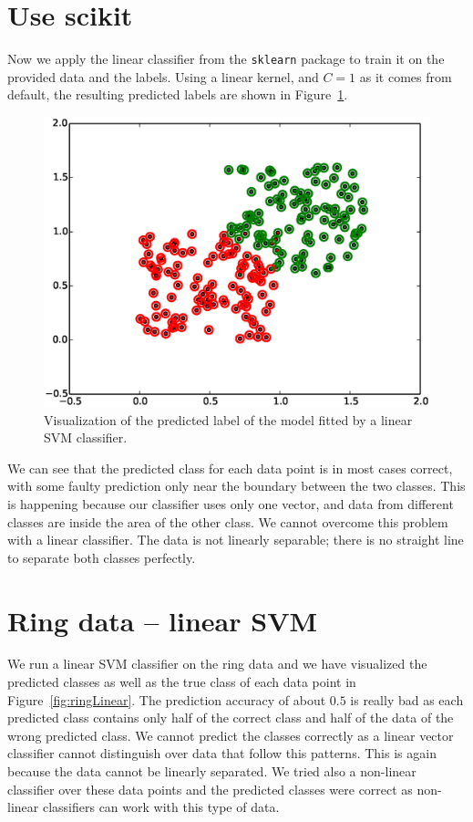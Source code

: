 \documentclass[a4paper,10pt]{article}
\begin{document}
\section{Use scikit}
Now we apply the linear classifier from the \texttt{sklearn} package to train it on the provided data and the labels. Using a linear kernel, and $C = 1$ as it comes from default, the resulting predicted labels are shown in Figure~\ref{fig:linearClass}.
\begin{figure}[ht!]
    \centering
    \includegraphics[width=1.00\textwidth]{svmFit.eps}
    \caption{Visualization of the predicted label of the model fitted by a linear SVM classifier.}
    \label{fig:linearClass}
\end{figure}

We can see that the predicted class for each data point is in most cases correct, with some faulty prediction only near the boundary between the two classes. This is happening because our classifier uses only one vector, and data from different classes are inside the area of the other class. We cannot overcome this problem with a linear classifier.  The data is not linearly separable; there is no straight line to separate both classes perfectly.
    
\section{Ring data -- linear SVM}
We run a linear SVM classifier on the ring data and we have visualized the predicted classes as well as the true class of each data point in Figure~\ref{fig:ringLinear}. The prediction accuracy of about $0.5$ is really bad as each predicted class contains only half of the correct class and half of the data of the wrong predicted class. We cannot predict the classes correctly as a linear vector classifier cannot distinguish over data that follow this patterns.  This is again because the data cannot be linearly separated. We tried also a non-linear classifier over these data points and the predicted classes were correct as non-linear classifiers can work with this type of data. 
\end{document}

